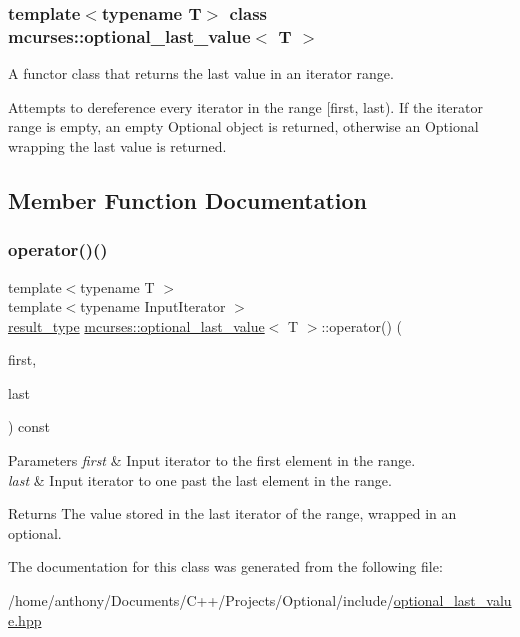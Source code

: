 \subsubsection*{template$<$typename T$>$\newline
class mcurses\+::optional\+\_\+last\+\_\+value$<$ T $>$}

A functor class that returns the last value in an iterator range. 

Attempts to dereference every iterator in the range \mbox{[}first, last). If the iterator range is empty, an empty Optional object is returned, otherwise an Optional wrapping the last value is returned. 

\subsection{Member Function Documentation}
\hypertarget{classmcurses_1_1optional__last__value_a05976d77a820e8f62e71536dc53a22b2}{}\label{classmcurses_1_1optional__last__value_a05976d77a820e8f62e71536dc53a22b2} 
\subsubsection{\texorpdfstring{operator()()}{operator()()}}
{\footnotesize\ttfamily template$<$typename T $>$ \\
template$<$typename Input\+Iterator $>$ \\
\hyperlink{classmcurses_1_1optional__last__value_a6d0906441eeb16529466b239fd3d2066}{result\+\_\+type} \hyperlink{classmcurses_1_1optional__last__value}{mcurses\+::optional\+\_\+last\+\_\+value}$<$ T $>$\+::operator() (\begin{DoxyParamCaption}\item[{Input\+Iterator}]{first,  }\item[{Input\+Iterator}]{last }\end{DoxyParamCaption}) const\hspace{0.3cm}{\ttfamily [inline]}}


\begin{DoxyParams}{Parameters}
{\em first} & Input iterator to the first element in the range. \\
\hline
{\em last} & Input iterator to one past the last element in the range. \\
\hline
\end{DoxyParams}
\begin{DoxyReturn}{Returns}
The value stored in the last iterator of the range, wrapped in an optional. 
\end{DoxyReturn}


The documentation for this class was generated from the following file\+:\begin{DoxyCompactItemize}
\item 
/home/anthony/\+Documents/\+C++/\+Projects/\+Optional/include/\hyperlink{optional__last__value_8hpp}{optional\+\_\+last\+\_\+value.\+hpp}\end{DoxyCompactItemize}
